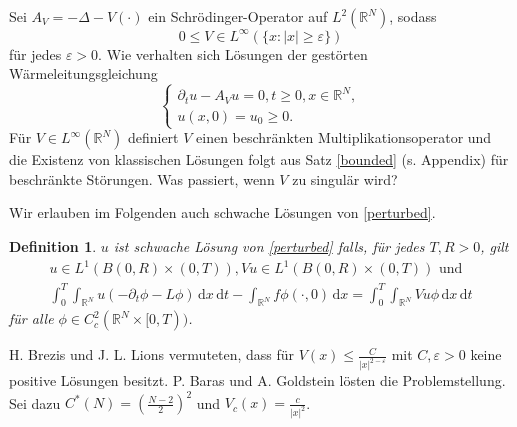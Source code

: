 \documentclass[11pt,twoside,a4paper]{article}
\newtheorem{df}[thm]{Definition}
\theoremstyle{break}
\begin{document}
Sei $A_V= -\Delta - V(\cdot)$ ein Schr\"odinger-Operator auf $L^2(\mathbb R^N)$, sodass
\begin{equation}
0\le V\in L^\infty(\{x:|x|\ge \varepsilon\})
\end{equation}\label{perturbed}
f\"ur jedes $\varepsilon>0$. Wie verhalten sich L\"osungen der gest\"orten W\"armeleitungsgleichung 
\begin{equation}\label{perturbed}
\begin{cases}
\partial_t u - A_V u =0, t\ge 0, x\in \mathbb R^N,\\
u(x,0)=u_0 \ge 0.
\end{cases}
\end{equation}
F\"ur $V\in L^\infty(\mathbb R^N)$ definiert $V$ einen beschr\"ankten Multiplikationsoperator und die Existenz von klassischen L\"osungen folgt aus Satz \ref{bounded} (s. Appendix) f\"ur beschr\"ankte St\"orungen. %
Was passiert, wenn $V$ zu singul\"ar wird?

Wir erlauben im Folgenden auch schwache L\"osungen von \eqref{perturbed}. \vspace{.25cm}
\begin{df}
$u$ ist schwache L\"osung von \eqref{perturbed} falls, f\"ur jedes $T, R>0$, gilt
\begin{gather}\label{weak}
u\in L^1(B(0,R) \times (0,T)), Vu \in L^1(B(0,R)\times (0,T)) \text{ und }\\
\int_0^T \int_{\mathbb R^N} u (-\partial_t \phi - L\phi) \, \mathrm dx \, \mathrm dt - \int_{\mathbb R^N} f \phi(\cdot, 0) \, \mathrm dx = \int_0^T \int_{\mathbb R^N} V u \phi \, \mathrm dx \, \mathrm dt
\end{gather}
f\"ur alle $\phi \in C_c^2(\mathbb R^N\times [0,T))$.
\end{df}

H. Brezis und J. L. Lions vermuteten, dass f\"ur $V(x) \le \frac{C}{|x|^{2-\varepsilon}}$ mit $C, \varepsilon>0$ keine positive L\"osungen besitzt. P. Baras und A. Goldstein l\"osten die Problemstellung.  Sei dazu $C^*(N)=( \tfrac{N-2}{2} )^2$ und $V_c(x) = \frac{c}{|x|^2}$. \vspace{.25cm}
\end{document}
